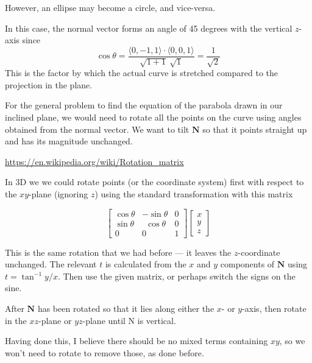 \documentclass[11pt, oneside]{article}
\begin{document}
However, an ellipse may become a circle, and vice-versa.

In this case, the normal vector forms an angle of 45 degrees with the vertical $z$-axis since
\[ \cos \theta = \frac{\langle 0, -1, 1 \rangle \cdot \langle 0, 0, 1 \rangle}{\sqrt{1 + 1} \ \sqrt{1}} = \frac{1}{\sqrt{2}} \]
This is the factor by which the actual curve is stretched compared to the projection in the plane.

For the general problem to find the equation of the parabola drawn in our inclined plane, we would need to rotate all the points on the curve using angles obtained from the normal vector.  We want to tilt $\mathbf{N}$ so that it points straight up and has its magnitude unchanged.

\url{https://en.wikipedia.org/wiki/Rotation_matrix}

In 3D we we could rotate points (or the coordinate system) first with respect to the $xy$-plane (ignoring $z$) using the standard transformation with this matrix

\[
\begin{bmatrix}  
\cos \theta & -\sin \theta & 0 \\
\sin \theta & \ \  \cos \theta & 0 \\
0 & 0 & 1 
\end{bmatrix}
\begin{bmatrix}  x \\ y \\ z \end{bmatrix}
\]

This is the same rotation that we had before --- it leaves the $z$-coordinate unchanged.  The relevant $t$ is calculated from the $x$ and $y$ components of $\mathbf{N}$ using $t = \tan^{-1} y/x$.  Then use the given matrix, or perhaps switch the signs on the sine.

After $\mathbf{N}$ has been rotated so that it lies along either the $x$- or $y$-axis, then rotate in the $xz$-plane or $yz$-plane until N is vertical.

Having done this, I believe there should be no mixed terms containing $xy$, so we won't need to rotate to remove those, as done before.
 
\end{document}
